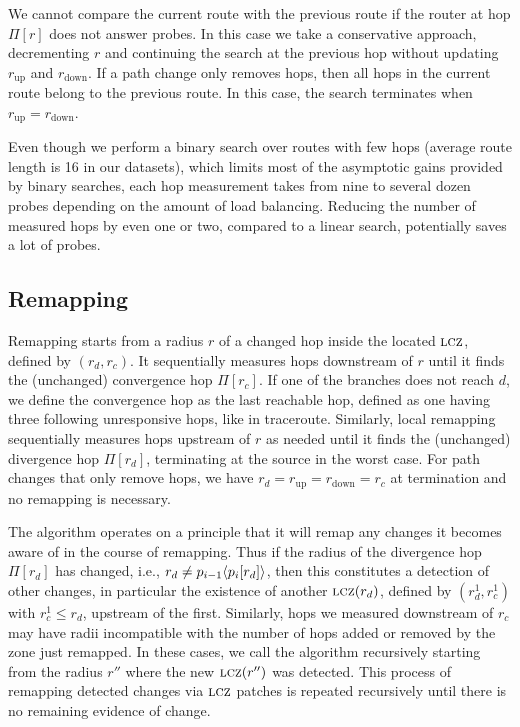 We cannot compare the current route with the previous route if the
router at hop $\Pi[r]$ does not answer probes.  In this case we take a
conservative approach, decrementing $r$ and continuing the search at the
previous hop without updating $r_\mathrm{up}$ and $r_\mathrm{down}$.  If
a path change only removes hops, then all hops in the current route
belong to the previous route.  In this case, the search terminates when
$r_\mathrm{up} = r_\mathrm{down}$.

Even though we perform a binary search over routes with few hops
(average route length is 16 in our datasets), which limits most of the
asymptotic gains provided by binary searches, each hop measurement takes
from nine to several dozen probes depending on the amount of load
balancing.  Reducing the number of measured hops by even one or two,
compared to a linear search, potentially saves a lot of probes.


\subsection{Remapping}
\label{sec:remap.local}

Remapping starts from a radius $r$ of a changed hop inside the located
$\mathrm{\textsc{lcz}}$, defined by $(r_d,r_c)$.  It sequentially measures hops
downstream of $r$ until it finds the (unchanged) convergence hop
$\Pi[r_c]$.  If one of the branches does not reach $d$, we define the
convergence hop as the last reachable hop, defined as one having three
following unresponsive hops, like in traceroute.  Similarly, local
remapping sequentially measures hops upstream of $r$ as needed until it
finds the (unchanged) divergence hop $\Pi[r_d]$,  terminating at the
source in the worst case.    For path changes that only remove hops, we
have $r_d = r_\mathrm{up} = r_\mathrm{down}=r_c$ at termination and no
remapping is necessary.

The algorithm operates on a principle that it will remap any changes it
becomes aware of in the course of remapping.  Thus if the radius of the
divergence hop $\Pi[r_d]$ has changed, i.e., $r_d \ne p_{i-1}\langle
p_i[r_d]\rangle$, then this constitutes a detection of other changes, in
particular the existence of another $\mathrm{\textsc{lcz}}(r_d)$, defined by
$(r_d^1,r_c^1)$ with $r_c^1\le r_d$, upstream of the first.  Similarly,
hops we measured downstream of $r_c$ may have radii incompatible with
the number of hops added or removed by the zone just remapped.  In these
cases, we call the algorithm recursively starting from the radius $r''$
where the new $\mathrm{\textsc{lcz}}(r'')$ was detected.  This process of remapping
detected changes via $\mathrm{\textsc{lcz}}$ patches is repeated recursively until there
is no remaining evidence of change.

